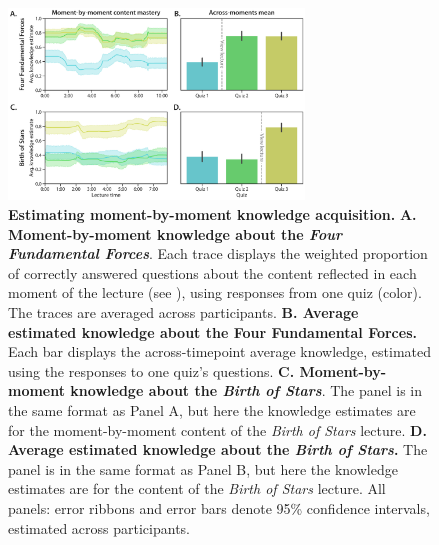 \documentclass[10pt]{article}
\begin{document}
\begin{figure}[tp]
    \centering
    \includegraphics[width=0.7\textwidth]{figs/content-mastery}

    \caption{\textbf{Estimating moment-by-moment knowledge acquisition.}
    \textbf{A. Moment-by-moment knowledge about the \textit{Four Fundamental
    Forces}}. Each trace displays the weighted proportion of correctly answered
    questions about the content reflected in each moment of the lecture (see
    \textit{}), using responses from one
    quiz (color). The traces are averaged across participants. \textbf{B.
    Average estimated knowledge about the \textbf{Four Fundamental Forces}.}
    Each bar displays the across-timepoint average knowledge, estimated using
    the responses to one quiz's questions. \textbf{C. Moment-by-moment
    knowledge about the \textit{Birth of Stars}}. The panel is in the same
    format as Panel A, but here the knowledge estimates are for the
    moment-by-moment content of the \textit{Birth of Stars} lecture. \textbf{D.
    Average estimated knowledge about the \textit{Birth of Stars}.} The panel
    is in the same format as Panel B, but here the knowledge estimates are for
    the content of the \textit{Birth of Stars} lecture. All panels: error
    ribbons and error bars denote 95\% confidence intervals, estimated across
    participants.}

    \label{fig:knowledge-timeseries}
\end{figure}
\end{document}
